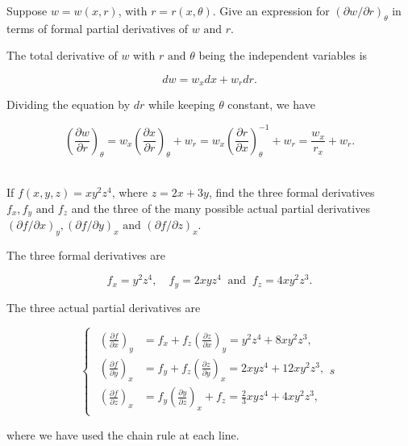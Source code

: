 \documentclass[english,a4paper,12pt]{report}
\begin{document}
{Suppose \(w = w(x,r)\), with \(r = r(x,\theta )\). Give an expression for \(\left( \partial w /\partial r \right)_{\theta } \) in terms of formal partial derivatives of \(w \text { and } r\).  }
{The total derivative of \(w\) with \(r \text { and } \theta \) being the independent variables is 

\begin{equation}
	dw = w_{x} dx + w_{r} dr. 
\end{equation}

Dividing the equation by \(dr\) while keeping \(\theta \) constant, we have 

\begin{equation}
	\left(\frac{\partial w}{\partial r}\right) _{\theta } = w_{x} \left( \frac{\partial x}{\partial r}  \right)_{\theta } + w_{r} =  w_{x}\left( \frac{\partial r}{\partial x}  \right)^{-1} _{\theta } + w_{r} = \frac{w_{x} }{r_{x} } + w_{r}.    
\end{equation}
~
} 

{If \(f(x,y,z) = xy^2z^{4} \), where \(z = 2x+3y\), find the three formal derivatives \(f_{x},f_{y} \text { and } f_{z}   \)  and the three of the many possible actual partial derivatives \((\partial f/\partial x)_{y}, (\partial f /\partial y)_{x} \text { and } (\partial f / \partial z)_{x}  \).}
{The three formal derivatives are 

\begin{equation}
	f_{x}= y^2z^{4}, \quad f_{y} = 2xyz^{4} ~\text { and }~ f_{z} = 4xy^2z^3 .     
\end{equation}

The three actual partial derivatives are 

\begin{equation}
	\begin{cases}
		\begin{aligned}
			\left( \frac{\partial f}{\partial x}  \right)_{y} &= f_{x} + f_{z}\left( \frac{\partial z}{\partial x}  \right)_{y} = y^2z^{4}+8xy^2z^3,\\
			\left( \frac{\partial f}{\partial y}  \right)_{x} &= f_{y} + f_{z}\left( \frac{\partial z}{\partial y}  \right)_{x} = 2xyz^{4}+12xy^2z^3,\\
			\left( \frac{\partial f}{\partial z}  \right)_{x} &= f_{y}\left( \frac{\partial y}{\partial z}  \right)_{x} + f_{z} = \frac{2}{3}xyz^{4}+4xy^2z^3, 
		\end{aligned}s
	\end{cases}
\end{equation}

where we have used the chain rule at each line.
} 
\end{document}
